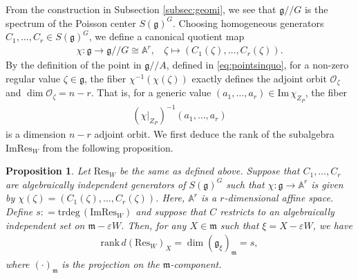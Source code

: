 \documentclass[11pt]{amsart}
\newtheorem{proposition}[theorem]{Proposition}
\theoremstyle{definition}
\theoremstyle{plain}
\theoremstyle{conclusion}
\begin{document}
From the construction in Subsection \ref{subsec:geomi}, we see that $\mathfrak{g}//G$ is the spectrum of the Poisson center $S(\mathfrak{g})^G$. Choosing homogeneous generators $C_1,\ldots,C_r \in S(\mathfrak{g})^G$, we define a canonical quotient map \begin{align}
    \chi: \mathfrak{g} \longrightarrow \mathfrak{g}//G \cong \mathbb{A}^r, \  \text{ } \zeta \longmapsto (C_1(\zeta),\ldots,C_r(\zeta)).  \label{eq:quotient}
\end{align} By the definition of the point in $\mathfrak{g}//A$, defined in \eqref{eq:pointsinquo}, for a non-zero regular value $\zeta \in \mathfrak{g}$, the fiber $\chi^{-1} \left(\chi(\zeta)\right)$ exactly defines the adjoint orbit $\mathcal{O}_\zeta$ and $\dim \mathcal{O}_\zeta = n -r $. That is, for a generic value $(a_1,\ldots,a_r) \in \mathrm{Im}\, \chi_{Z_P}$, the fiber \begin{align*}
    \left(\chi\vert_{Z_P}\right)^{-1}(a_1,\ldots,a_r)
\end{align*} is a dimension $n-r$ adjoint orbit. We first deduce the rank of the subalgebra $\mathrm{Im Res}_W$ from the following proposition. 
\begin{proposition}
\label{pro:dimension}
 Let $\mathrm{Res}_W$ be the same as defined above. Suppose that $C_1, \ldots,C_r$ are algebraically independent generators of $S(\mathfrak{g})^G$ such that $\chi: \mathfrak{g} \rightarrow \mathbb{A}^r$ is given by $\chi(\zeta) = \left(C_1(\zeta),\ldots,C_r(\zeta)\right)$. Here, $\mathbb{A}^r$ is a $r$-dimensional affine space. Define $s: = \mathrm{trdeg} \, \left(\mathrm{Im Res}_W\right)$ and suppose that $C$ restricts to an algebraically independent set on $\mathfrak{m} -\varepsilon W$. Then, for any $X \in \mathfrak{m}$ such that $\xi = X - \varepsilon W$, we have \begin{align*}
     \mathrm{rank} \, d(\mathrm{Res}_W)_X = \dim \left(\mathfrak{g}_\xi\right)_\mathfrak{m} = s,
 \end{align*} where $(\cdot)_\mathfrak{m}$ is the projection on the $\mathfrak{m}$-component.
\end{proposition}
\end{document}
